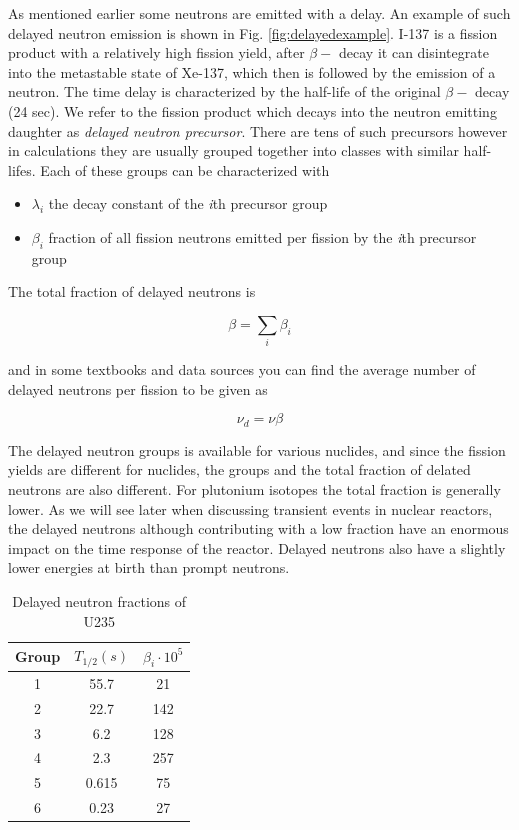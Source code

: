 As mentioned earlier some neutrons are emitted with a delay. An example of such delayed neutron emission is shown in Fig. \ref{fig:delayedexample}. I-137 is a fission product with a relatively high fission yield, after $\beta -$ decay it can disintegrate into the metastable state of Xe-137, which then is followed by the emission of a neutron. The time delay is characterized by the half-life of the original $\beta -$ decay (24 sec). We refer to the fission product which decays into the neutron emitting daughter as \textit{delayed neutron precursor}. There are tens of such precursors however in calculations they are usually grouped together into classes with similar half-lifes. Each of these groups can be characterized with

\begin{itemize}
\item $\lambda_i$ the decay constant of the \textit{i}th precursor group
\item $\beta_i$ fraction of all fission neutrons emitted per fission by the \textit{i}th precursor group
\end{itemize} 

The total fraction of delayed neutrons is

\[
\beta=\sum_i \beta_i
\]

and in some textbooks and data sources you can find the average number of delayed neutrons per fission to be given as

\[
\nu_d=\nu\beta
\]


The delayed neutron groups is available for various nuclides, and since the fission yields are different for nuclides, the groups and the total fraction of delated neutrons are also different. For plutonium isotopes the total fraction is generally lower. As we will see later when discussing transient events in nuclear reactors, the delayed neutrons although contributing with a low fraction have an enormous impact on the time response of the reactor. Delayed neutrons also have a slightly lower energies at birth than prompt neutrons. 

\begin{table}\caption{Delayed neutron fractions of U235}
\centering\begin{tabular}{c | c | c}
Group & $T_{1/2} (s)$ & $\beta_i\cdot 10^5$ \\
\hline
1 & 55.7 & 21 \\
2 & 22.7 & 142 \\
3 & 6.2 & 128 \\
4 & 2.3 & 257 \\
5 & 0.615 & 75 \\
6 & 0.23 & 27 
\end{tabular}
\end{table}

